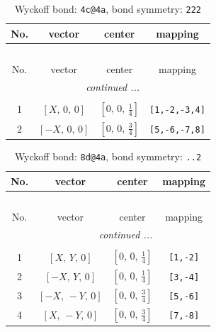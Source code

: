 \documentclass[fleqn,8pt]{jsarticle}
\begin{document}
\renewcommand{\arraystretch}{1.2}
\begin{longtable}{cccc}
\caption{Wyckoff bond: {\tt 4c@4a}, bond symmetry: {\tt 222}}
 \\
 \hline \hline
No. & vector & center & mapping \\ \hline \endfirsthead

\multicolumn{3}{l}{\tablename\ \thetable{}} \\
 \hline \hline
No. & vector & center & mapping \\ \hline \endhead

 \hline \hline
\multicolumn{3}{r}{\footnotesize\it continued ...} \\ \endfoot

 \hline \hline
\multicolumn{3}{r}{} \\ \endlastfoot

1 & $\left[ X,\, 0,\, 0 \right]$ & $\left[ 0,\, 0,\, \frac{1}{4} \right]$ & {\tt [1,-2,-3,4]} \\ \hline
2 & $\left[ - X,\, 0,\, 0 \right]$ & $\left[ 0,\, 0,\, \frac{3}{4} \right]$ & {\tt [5,-6,-7,8]} \\
\end{longtable}
\renewcommand{\arraystretch}{1.2}
\begin{longtable}{cccc}
\caption{Wyckoff bond: {\tt 8d@4a}, bond symmetry: {\tt ..2}}
 \\
 \hline \hline
No. & vector & center & mapping \\ \hline \endfirsthead

\multicolumn{3}{l}{\tablename\ \thetable{}} \\
 \hline \hline
No. & vector & center & mapping \\ \hline \endhead

 \hline \hline
\multicolumn{3}{r}{\footnotesize\it continued ...} \\ \endfoot

 \hline \hline
\multicolumn{3}{r}{} \\ \endlastfoot

1 & $\left[ X,\, Y,\, 0 \right]$ & $\left[ 0,\, 0,\, \frac{1}{4} \right]$ & {\tt [1,-2]} \\ \hline
2 & $\left[ - X,\, Y,\, 0 \right]$ & $\left[ 0,\, 0,\, \frac{1}{4} \right]$ & {\tt [3,-4]} \\ \hline
3 & $\left[ - X,\, - Y,\, 0 \right]$ & $\left[ 0,\, 0,\, \frac{3}{4} \right]$ & {\tt [5,-6]} \\ \hline
4 & $\left[ X,\, - Y,\, 0 \right]$ & $\left[ 0,\, 0,\, \frac{3}{4} \right]$ & {\tt [7,-8]} \\
\end{longtable}
\end{document}
